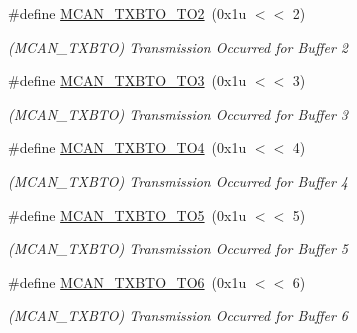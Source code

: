 \begin{DoxyCompactItemize}
\mbox{\label{group__SAMV71__MCAN_ga7d9c57979045a4abc746a24599fb1e1a}} 
\#define \mbox{\hyperlink{group__SAMV71__MCAN_ga7d9c57979045a4abc746a24599fb1e1a}{M\+C\+A\+N\+\_\+\+T\+X\+B\+T\+O\+\_\+\+T\+O2}}~(0x1u $<$$<$ 2)
\begin{DoxyCompactList}\small\item\em (M\+C\+A\+N\+\_\+\+T\+X\+B\+TO) Transmission Occurred for Buffer 2 \end{DoxyCompactList}\item 
\mbox{\label{group__SAMV71__MCAN_ga3b93ae097b6581599308b59e95d1a278}} 
\#define \mbox{\hyperlink{group__SAMV71__MCAN_ga3b93ae097b6581599308b59e95d1a278}{M\+C\+A\+N\+\_\+\+T\+X\+B\+T\+O\+\_\+\+T\+O3}}~(0x1u $<$$<$ 3)
\begin{DoxyCompactList}\small\item\em (M\+C\+A\+N\+\_\+\+T\+X\+B\+TO) Transmission Occurred for Buffer 3 \end{DoxyCompactList}\item 
\mbox{\label{group__SAMV71__MCAN_ga46698ccaf9b4649dba7db533cee8060c}} 
\#define \mbox{\hyperlink{group__SAMV71__MCAN_ga46698ccaf9b4649dba7db533cee8060c}{M\+C\+A\+N\+\_\+\+T\+X\+B\+T\+O\+\_\+\+T\+O4}}~(0x1u $<$$<$ 4)
\begin{DoxyCompactList}\small\item\em (M\+C\+A\+N\+\_\+\+T\+X\+B\+TO) Transmission Occurred for Buffer 4 \end{DoxyCompactList}\item 
\mbox{\label{group__SAMV71__MCAN_gaf335a10b97d8bb1bad5d0e5e3698e299}} 
\#define \mbox{\hyperlink{group__SAMV71__MCAN_gaf335a10b97d8bb1bad5d0e5e3698e299}{M\+C\+A\+N\+\_\+\+T\+X\+B\+T\+O\+\_\+\+T\+O5}}~(0x1u $<$$<$ 5)
\begin{DoxyCompactList}\small\item\em (M\+C\+A\+N\+\_\+\+T\+X\+B\+TO) Transmission Occurred for Buffer 5 \end{DoxyCompactList}\item 
\mbox{\label{group__SAMV71__MCAN_gabe09ca151513e62b3fe0a1352d4cdb4f}} 
\#define \mbox{\hyperlink{group__SAMV71__MCAN_gabe09ca151513e62b3fe0a1352d4cdb4f}{M\+C\+A\+N\+\_\+\+T\+X\+B\+T\+O\+\_\+\+T\+O6}}~(0x1u $<$$<$ 6)
\begin{DoxyCompactList}\small\item\em (M\+C\+A\+N\+\_\+\+T\+X\+B\+TO) Transmission Occurred for Buffer 6 \end{DoxyCompactList}\item 
$$
\end{DoxyCompactItemize}

